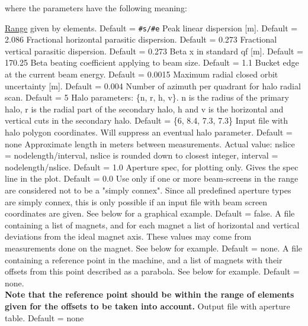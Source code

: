 where the parameters have the following meaning: 
\begin{madlist}
	 \hyperref[sec:range]{Range} given by
	elements. Default = \texttt{\#s/\#e}  
	 Peak linear dispersion [m]. Default = 2.086 
	 Fractional horizontal parasitic dispersion. Default = 0.273 
	 Fractional vertical parasitic dispersion. Default = 0.273 
	 Beta x in standard qf [m]. Default = 170.25 
	 Beta beating coefficient applying to beam size. Default = 1.1 
	 Bucket edge at the current beam energy. Default = 0.0015 
	 Maximum radial closed orbit uncertainty [m]. Default = 0.004 
	 Number of azimuth per quadrant for halo radial scan. Default = 5 
	 Halo parameters: \{n, r, h, v\}. n is the radius of the
	primary halo,  r is the radial part of the secondary halo, h and v
	is the horizontal and  vertical cuts in the secondary halo. Default
	= \{6, 8.4, 7.3, 7.3\}  
	 Input file with halo polygon coordinates. Will
	suppress  an eventual halo parameter. Default = none  
	 Approximate length in meters between
	measurements. Actual value:  nslice = nodelength/interval, nslice
	is rounded down to closest integer,  interval =
	nodelength/nslice. Default = 1.0  
	 Aperture spec, for plotting only. Gives the spec line in
	the plot. Default = 0.0  
	 Use only if one or more beam-screens in the range are
	considered not to  be a "simply connex". Since all predefined \madx aperture 
	types are simply connex, this is only possible  if an input file with
	beam screen coordinates are given. See below for a graphical
	example. Default = false.  
	 A file containing a list of magnets, and for each
	magnet a list of horizontal and vertical deviations from the ideal
	magnet axis. These values may come from measurements done on the
	magnet. See below for example. Default = none.  
	 A file containing a reference point in the machine,
	and a list of magnets with their offsets from this point described
	as a parabola. See below for example. Default = none. \\
	\textbf{Note that the reference point should be within the range of
	elements given for the offsets to be taken into account.}
	 Output file with aperture table. Default = none 
\end{madlist}

